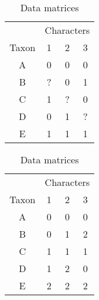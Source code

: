 \documentclass[11pt]{article}
\begin{document}
\begin{table}[htdp]
\begin{center}
\caption{Data matrices}\label{noPairwiseCompat}
\begin{tabular}{|c|c|c|c|}
\hline 
& \multicolumn{3}{c|}{Characters}\\
Taxon & 1& 2 & 3  \\ 
\hline 
A & 0 & 0 & 0 \\
B & ? & 0 & 1 \\
C & 1 & ? & 0 \\
D & 0 & 1 & ? \\
E & 1 & 1 & 1 \\
\hline 
\end{tabular}
\begin{tabular}{|c|c|c|c|}
\hline 
& \multicolumn{3}{c|}{Characters}\\
Taxon & 1 & 2 & 3  \\ 
\hline
A & 0 & 0 & 0 \\
B & 0 & 1 & 2 \\
C & 1 & 1 & 1 \\
D & 1 & 2 & 0 \\
E & 2 & 2 & 2 \\
\hline 
\end{tabular}
\end{center}
\end{table}
\end{document}
